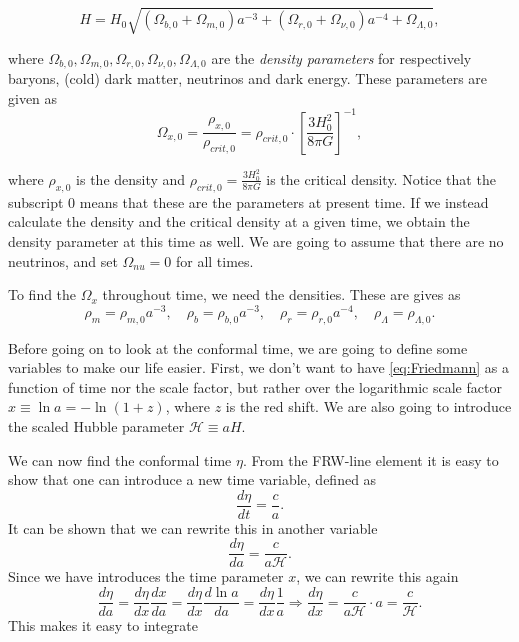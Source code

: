 \documentclass[a4paper,norsk, 10pt]{article}
\begin{document}
\begin{equation}\label{eq:Friedmann}
H = H_0 \sqrt{(\Omega_{b,0} + \Omega_{m,0})a^{-3} + (\Omega_{r,0} + \Omega_{\nu,0})a^{-4} + \Omega_{\Lambda,0}},
\end{equation}

where $\Omega_{b,0}, \Omega_{m,0}, \Omega_{r,0}, \Omega_{\nu,0}, \Omega_{\Lambda,0}$ are the \textit{density parameters} for respectively baryons, (cold) dark matter, neutrinos and dark energy. These parameters are given as
\begin{equation}\label{eq:Omega}
\Omega_{x,0} = \frac{\rho_{x,0}}{\rho_{crit,0}} = \rho_{crit,0}\cdot\left[\frac{3H_0^2}{8\pi G}\right]^{-1},
\end{equation}

where $\rho_{x,0}$ is the density and $\rho_{crit,0} = \frac{3H_0^2}{8\pi G}$ is the critical density. Notice that the subscript $0$ means that these are the parameters at present time. If we instead calculate the density and the critical density at a given time, we obtain the density parameter at this time as well. We are going to assume that there are no neutrinos, and set $\Omega_{nu} = 0$ for all times.

To find the $\Omega_{x}$ throughout time, we need the densities. These are gives as
\begin{equation}\label{eq:rho}
\rho_{m} = \rho_{m,0} a^{-3}, \quad \rho_{b} = \rho_{b,0} a^{-3}, \quad \rho_{r} = \rho_{r,0} a^{-4}, \quad \rho_{\Lambda} = \rho_{\Lambda,0}.
\end{equation}

Before going on to look at the conformal time, we are going to define some variables to make our life easier. First, we don't want to have \eqref{eq:Friedmann} as a function of time nor the scale factor, but rather over the logarithmic scale factor $x \equiv \ln a = - \ln(1+z)$, where $z$ is the red shift. We are also going to introduce the scaled Hubble parameter $\mathcal{H} \equiv aH$.

We can now find the conformal time $\eta$. From the FRW-line element it is easy to show that one can introduce a new time variable, defined as
\begin{equation}
\frac{d\eta}{dt} = \frac{c}{a}.
\end{equation}
It can be shown that we can rewrite this in another variable
\begin{equation}
\frac{d \eta}{da} = \frac{c}{a\mathcal{H}}.
\end{equation}
Since we have introduces the time parameter $x$, we can rewrite this again
\begin{equation}\label{eq:deta/dx}
\frac{d\eta}{da} = \frac{d\eta}{dx}\frac{dx}{da} = \frac{d\eta}{dx}\frac{d \ln a}{da} = \frac{d\eta}{dx}\frac{1}{a} \Rightarrow \frac{d\eta}{dx} = \frac{c}{a\mathcal{H}}\cdot a = \frac{c}{\mathcal{H}}.
\end{equation}
This makes it easy to integrate 
\end{document}
